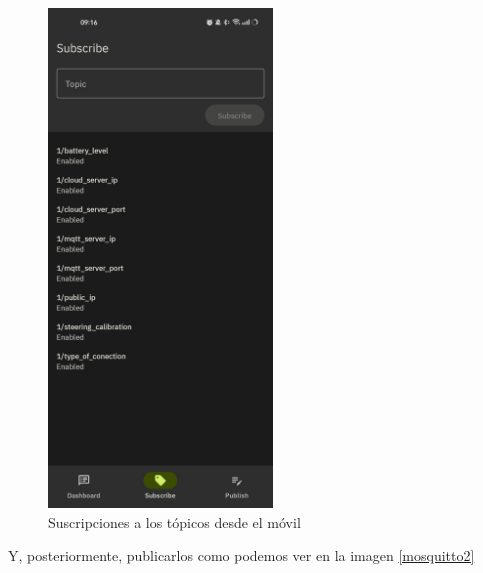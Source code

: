 \begin{enumerate}
{ \begin{figure}[H]
    \centering
    \includegraphics[width=0.53\textwidth]{Imagenes/Rendimiento/mosquitto1.jpeg}
    \caption{Suscripciones a los tópicos desde el móvil}
    \label{mosquitto1}
\end{figure}

Y, posteriormente, publicarlos como podemos ver en la imagen \ref{mosquitto2}

}
\end{enumerate}

